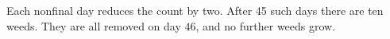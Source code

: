 Each nonfinal day reduces the count by two. After 45 such days there are ten weeds. They are all removed on day $\boxed{46}$, and no further weeds grow.
